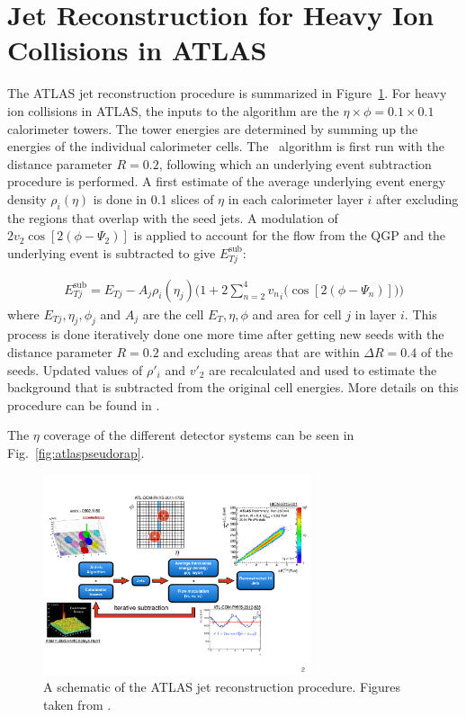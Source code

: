 
\section{Jet Reconstruction for Heavy Ion Collisions in ATLAS}
The ATLAS jet reconstruction procedure is summarized in Figure~\ref{fig:atlasHIjetreco}.
For heavy ion collisions in ATLAS, the inputs to the algorithm are the $\eta \times \phi = 0.1 \times 0.1$ calorimeter towers.
The tower energies are determined by summing up the energies of the individual calorimeter cells.
The \antikt\ algorithm is first run with the distance parameter $R=0.2$, following which an underlying event subtraction procedure is performed.
A first estimate of the average underlying event energy density $\rho_i (\eta)$ is done in 0.1 slices of $\eta$ in each calorimeter layer $i$ after excluding the regions that overlap with the seed jets.
A modulation of $2v_{2} \cos[2(\phi-\Psi_2)] $ is applied to account for the flow from the QGP and the underlying event is subtracted to give $E_{Tj}^{\mathrm{sub}}$:

\begin{align}
E_{Tj}^{\mathrm{sub}} = E_{Tj} - A_j \rho_i (\eta_j) \Big(1+2 \sum_{n=2}^{4} {v_{n}}_i \big(\cos[2(\phi-\Psi_n)] \big) \Big)
\end{align}
where $E_{Tj} , \eta_j, \phi_j$ and $A_j$ are the cell $E_T, \eta, \phi$ and area for cell $j$ in layer $i$.
This process is done iteratively done one more time after getting new seeds with the distance parameter $R = 0.2$ and excluding areas that are within $\Delta R = 0.4$ of the seeds.
Updated values of $\rho{'}_i$ and $v{'}_2$ are recalculated and used to estimate the background that is subtracted from the original cell energies.
More details on this procedure can be found in \cite{2013220}.

The $\eta$ coverage of the different detector systems can be seen in Fig.~\ref{fig:atlaspseudorap}.
\begin{figure}[htbp!]
	\centering
	\includegraphics[width=0.7\textwidth]{figures/setup/atlasHIjetReco} %
	\caption{A schematic of the ATLAS jet reconstruction procedure.
	Figures taken from \cite{}.}	
	\label{fig:atlasHIjetreco}%
\end{figure}


%
